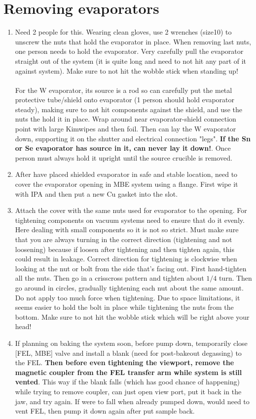 \section{Removing evaporators}
\begin{enumerate}
\item	Need 2 people for this. Wearing clean gloves, use 2 wrenches (size10) to unscrew the nuts that hold the evaporator in place. When removing last nuts, one person needs to hold the evaporator. Very carefully pull the evaporator straight out of the system (it is quite long and need to not hit any part of it against system). Make sure to not hit the wobble stick when standing up! \\\\
For the W evaporator, its source is a rod so can carefully put the metal protective tube/shield onto evaporator (1 person should hold evaporator steady), making sure to not hit components against the shield, and use the nuts the hold it in place. Wrap around near evaporator-shield connection point with large Kimwipes and then foil. Then can lay the W evaporator down, supporting it on the shutter and electrical connection "legs". \textbf{If the Sn or Se evaporator has source in it, can never lay it down!}. Once person must always hold it upright until the source crucible is removed.
\item	After have placed shielded evaporator in safe and stable location, need to cover the evaporator opening in MBE system using a flange.  First wipe it with IPA and then put a new Cu gasket into the slot. 
\item	Attach the cover with the same nuts used for evaporator to the opening. For tightening components on vacuum systems need to ensure that do it evenly. Here dealing with small components so it is not so strict. Must make sure that you are always turning in the correct direction (tightening and not loosening) because if loosen after tightening and then tighten again, this could result in leakage. Correct direction for tightening is clockwise when looking at the nut or bolt from the side that’s facing out. First hand-tighten all the nuts. Then go in a crisscross pattern and tighten about $1/4$ turn. Then go around in circles, gradually tightening each nut about the same amount. Do not apply too much force when tightening. Due to space limitations, it seems easier to hold the bolt in place while tightening the nuts from the bottom. Make sure to not hit the wobble stick which will be right above your head!
\item If planning on baking the system soon, before pump down, temporarily close [FEL, MBE] valve and install a blank (need for post-bakeout degassing) to the FEL. \textbf{Then before even tightening the viewport, remove the magnetic coupler from the FEL transfer arm while system is still vented}. This way if the blank falls (which has good chance of happening) while trying to remove coupler, can just open view port, put it back in the jaw, and try  again. If were to fall when already pumped down, would need to vent FEL, then pump it down again after put sample back.

\end{enumerate}
